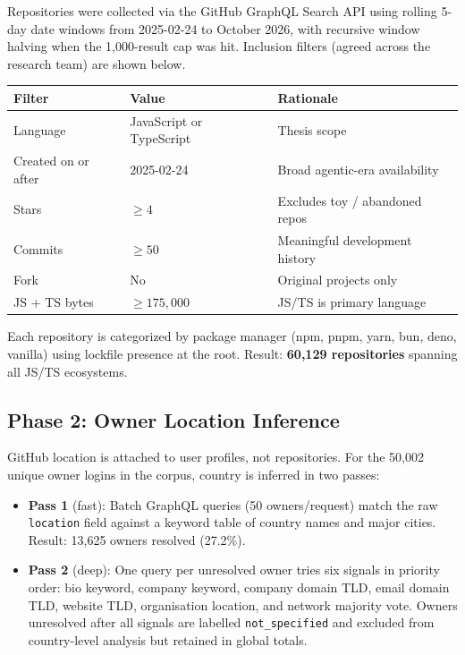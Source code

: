 \documentclass[11pt,a4paper]{article}
\begin{document}
Repositories were collected via the GitHub GraphQL Search API using rolling 5-day date windows
from 2025-02-24 to October 2026, with recursive window halving when the 1,000-result cap was
hit. Inclusion filters (agreed across the research team) are shown below.

\begin{center}
\begin{tabular}{@{}lll@{}}
\toprule
\textbf{Filter} & \textbf{Value} & \textbf{Rationale} \\
\midrule
Language            & JavaScript or TypeScript & Thesis scope \\
Created on or after & 2025-02-24               & Broad agentic-era availability \\
Stars               & $\geq 4$                 & Excludes toy / abandoned repos \\
Commits             & $\geq 50$                & Meaningful development history \\
Fork                & No                       & Original projects only \\
JS + TS bytes       & $\geq 175{,}000$         & JS/TS is primary language \\
\bottomrule
\end{tabular}
\end{center}

Each repository is categorized by package manager (npm, pnpm, yarn, bun, deno, vanilla)
using lockfile presence at the root. Result: \textbf{60,129 repositories} spanning
all JS/TS ecosystems.

\subsection{Phase 2: Owner Location Inference}

GitHub location is attached to user profiles, not repositories. For the 50,002 unique
owner logins in the corpus, country is inferred in two passes:

\begin{itemize}
    \item \textbf{Pass 1} (fast): Batch GraphQL queries (50 owners/request) match the raw
          \texttt{location} field against a keyword table of country names and major cities.
          Result: 13,625 owners resolved (27.2\%).
    \item \textbf{Pass 2} (deep): One query per unresolved owner tries six signals in priority
          order: bio keyword, company keyword, company domain TLD, email domain TLD,
          website TLD, organisation location, and network majority vote.
          Owners unresolved after all signals are labelled \texttt{not\_specified} and
          excluded from country-level analysis but retained in global totals.
\end{itemize}
\end{document}
